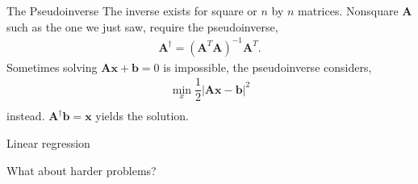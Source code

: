 \documentclass[notes=only]{beamer}
\begin{document}
    \begin{frame}{The Pseudoinverse \cite{strang2009introduction,deisenroth2020mathematics}}
      The inverse exists for square or $n$ by $n$ matrices.
      Nonsquare $\mathbf{A}$ such as the one we just saw, require the pseudoinverse,
        \begin{align}
          \mathbf{A}^{\dagger} = (\mathbf{A}^T\mathbf{A})^{-1}\mathbf{A}^T .
        \end{align}
      Sometimes solving $\mathbf{A}\mathbf{x} + \mathbf{b} = 0$ is impossible,
      the pseudoinverse considers,
        \begin{align}
          \min_x \dfrac{1}{2}|\mathbf{A}\mathbf{x} - \mathbf{b}|^2 \\
        \end{align}
      instead. $\mathbf{A}^{\dagger} \mathbf{b} = \mathbf{x}$ yields the solution.

    \end{frame}

    \begin{frame}{Linear regression}
      \begin{figure}
        
      \end{figure}
    \end{frame}

    \begin{frame}{What about harder problems?}
      \begin{figure}
        
      \end{figure}
    \end{frame}
\end{document}
